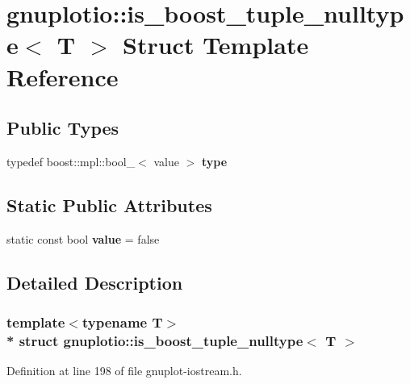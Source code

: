 \hypertarget{structgnuplotio_1_1is__boost__tuple__nulltype}{}\section{gnuplotio\+:\+:is\+\_\+boost\+\_\+tuple\+\_\+nulltype$<$ T $>$ Struct Template Reference}
\label{structgnuplotio_1_1is__boost__tuple__nulltype}
\subsection*{Public Types}
\begin{DoxyCompactItemize}
\item 
typedef boost\+::mpl\+::bool\+\_\+$<$ value $>$ {\bfseries type}\hypertarget{structgnuplotio_1_1is__boost__tuple__nulltype_a6b9e2eaadcaa5c788131d4e9e4186349}{}\label{structgnuplotio_1_1is__boost__tuple__nulltype_a6b9e2eaadcaa5c788131d4e9e4186349}

\end{DoxyCompactItemize}
\subsection*{Static Public Attributes}
\begin{DoxyCompactItemize}
\item 
static const bool {\bfseries value} = false\hypertarget{structgnuplotio_1_1is__boost__tuple__nulltype_aed42a98e58eb94c7ba55ea7d2a8f7fd2}{}\label{structgnuplotio_1_1is__boost__tuple__nulltype_aed42a98e58eb94c7ba55ea7d2a8f7fd2}

\end{DoxyCompactItemize}


\subsection{Detailed Description}
\subsubsection*{template$<$typename T$>$\\*
struct gnuplotio\+::is\+\_\+boost\+\_\+tuple\+\_\+nulltype$<$ T $>$}



Definition at line 198 of file gnuplot-\/iostream.\+h.

